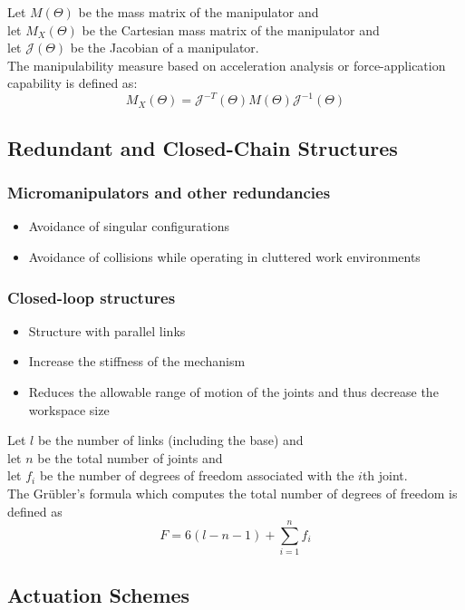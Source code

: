 \documentclass[10pt,a4paper]{article}
\begin{document}
Let $M(\Theta)$ be the mass matrix of the manipulator and \\
let $M_X(\Theta)$ be the Cartesian mass matrix of the manipulator and \\
let $\mathcal{J}(\Theta)$ be the Jacobian of a manipulator. \\
The manipulability measure based on acceleration analysis or force-application capability is defined as:
$$
	M_X(\Theta) = \mathcal{J}^{-T}(\Theta)M(\Theta)\mathcal{J}^{-1}(\Theta)
$$

\subsection{Redundant and Closed-Chain Structures}
\subsubsection{Micromanipulators and other redundancies}
\begin{itemize}
	\item Avoidance of singular configurations
	\item Avoidance of collisions while operating in cluttered work environments
\end{itemize}

\subsubsection{Closed-loop structures}
\begin{itemize}
	\item Structure with parallel links
	\item Increase the stiffness of the mechanism
	\item Reduces the allowable range of motion of the joints and thus decrease the workspace size
\end{itemize}

Let $l$ be the number of links (including the base) and \\
let $n$ be the total number of joints and \\
let $f_i$ be the number of degrees of freedom associated with the $i$th joint. \\
The Grübler's formula which computes the total number of degrees of freedom is defined as
$$
	F = 6(l - n - 1) + \sum_{i = 1}^n f_i
$$

\subsection{Actuation Schemes}
\end{document}
